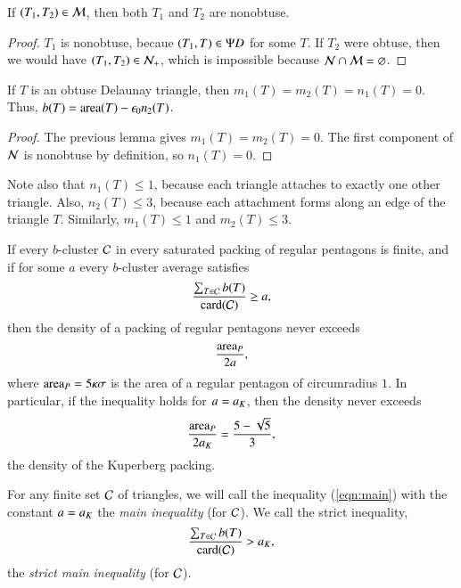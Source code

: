 \begin{lemma} If $(T_1,T_2)\in \mathcal M$, then both $T_1$ and $T_2$ are nonobtuse.
\end{lemma}

\begin{proof}  $T_1$ is nonobtuse, becaue $(T_1,T)\in\Psi D$ for some $T$.
If $T_2$ were obtuse, then we would have $(T_1,T_2)\in \mathcal N_+$, which is impossible
because $\mathcal N\cap \mathcal M = \varnothing$.
\end{proof}

\begin{lemma}[obtuse $b$]  If $T$ is an obtuse Delaunay triangle, then $m_1(T)=m_2(T)=n_1(T)=0$.
Thus, $b(T) = {\operatorname{area}}(T) - \epsilon_0 n_2(T)$.
\end{lemma}

\begin{proof}  The previous lemma gives $m_1(T)=m_2(T)=0$.  The first component of
$\mathcal N$ is nonobtuse by definition, so $n_1(T)=0$.
\end{proof}

\begin{remark}
  Note also that $n_1(T)\le 1$, because each triangle attaches to
  exactly one other triangle.  Also, $n_2(T)\le 3$, because each
  attachment forms along an edge of the triangle $T$.  Similarly,
  $m_1(T)\le 1$ and $m_2(T)\le 3$.
\end{remark}



\begin{lemma}\label{lemma:main}  
If  every $b$-cluster $\mathcal C$ in every saturated packing of regular
  pentagons is finite, and if for some $a$ every $b$-cluster average
  satisfies
\begin{equation}\label{eqn:main}
\frac{\sum_{T\in \mathcal C} b(T)}{{\operatorname{card}}(\mathcal C)} \ge a,
\end{equation}
then the density of a packing of regular pentagons never exceeds 
\[
\frac{{\operatorname{area}}_P} {2 a},
\]
where ${\operatorname{area}}_P = 5\kappa\sigma$ is the area of a regular pentagon of
circumradius $1$.  In particular, if the inequality holds for $a=a_K$,
then the density never exceeds
\[
\frac{{\operatorname{area}}_P}{2 a_K} = \frac{5 - \sqrt{5}}{3},
\] %
the density of the Kuperberg packing.
\end{lemma}

For any finite set $\mathcal C$ of triangles, we will call the inequality
(\ref{eqn:main}) with the constant $a=a_K$ the {\it main inequality}
(for $\mathcal C$).  We call the strict inequality,
\begin{equation}\label{eqn:strict-main}
\frac{\sum_{T\in \mathcal C} b(T)}{{\operatorname{card}}(\mathcal C)} > a_K,
\end{equation}
the {\it strict main inequality} (for $\mathcal C$).


